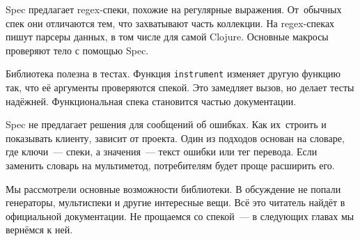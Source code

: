 Spec предлагает regex-спеки, похожие на регулярные выражения. От~обычных спек
они отличаются тем, что захватывают часть коллекции. На regex-спеках пишут
парсеры данных, в том числе для самой Clojure. Основные макросы проверяют тело с
помощью Spec.

Библиотека полезна в тестах. Функция \verb|instrument| изменяет другую функцию
так, что её аргументы проверяются спекой. Это замедляет вызов, но делает тесты
надёжней. Функциональная спека становится частью документации.

Spec не предлагает решения для сообщений об ошибках. Как их~строить и показывать
клиенту, зависит от проекта. Один из подходов основан на словаре, где ключи~---
спеки, а значения~--- текст ошибки или тег перевода. Если заменить словарь на
мультиметод, потребителям будет проще расширить его.

Мы рассмотрели основные возможности библиотеки. В обсуждение не попали
генераторы, мультиспеки и другие интересные вещи. Всё это читатель найдёт в
официальной документации. Не прощаемся со спекой~--- в следующих главах мы
вернёмся к ней.
